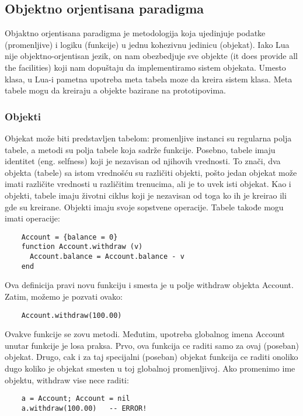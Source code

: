 \documentclass[a4paper]{article}
\begin{document}
\subsection{Objektno orjentisana paradigma}

Objaktno orjentisana paradigma je metodologija koja ujedinjuje podatke (promenljive) i logiku (funkcije) u jednu kohezivnu jedinicu (objekat). Iako Lua nije objektno-orjentisan jezik, on nam obezbedjuje sve objekte (it does provide all the facilities) koji nam dopuštaju da implementiramo sistem objekata. Umesto klasa, u Lua-i pametna upotreba meta tabela moze da kreira sistem klasa. Meta tabele mogu da kreiraju a objekte bazirane na prototipovima.

\subsubsection{Objekti}
Objekat može biti predstavljen tabelom: promenljive instanci su regularna polja tabele, a metodi su polja tabele koja sadrže funkcije. Posebno, tabele imaju identitet (eng. selfness) koji je nezavisan od njihovih vrednosti. To znači, dva objekta (tabele) sa istom vrednošću su različiti objekti, pošto jedan objekat može imati različite vrednosti u različitim trenucima, ali je to uvek isti objekat. Kao i objekti, tabele imaju životni ciklus koji je nezavisan od toga ko ih je kreirao ili gde su kreirane.
Objekti imaju svoje sopstvene operacije. Tabele takođe mogu imati operacije:
\begin{verbatim}
    Account = {balance = 0}
    function Account.withdraw (v)
      Account.balance = Account.balance - v
    end
\end{verbatim}
Ova definicija pravi novu funkciju i smesta je u polje withdraw objekta Account. Zatim, možemo je pozvati ovako:
\begin{verbatim}
    Account.withdraw(100.00)
\end{verbatim}

Ovakve funkcije se zovu metodi. Međutim, upotreba globalnog imena Account unutar funkcije je losa praksa. Prvo, ova funkcija ce raditi samo za ovaj (poseban) objekat. Drugo, cak i za taj specijalni (poseban) objekat funkcija ce raditi onoliko dugo koliko je objekat smesten u toj globalnoj promenljivoj. Ako promenimo ime objektu, withdraw vise nece raditi:
\begin{verbatim}
    a = Account; Account = nil
    a.withdraw(100.00)   -- ERROR!
\end{verbatim}
\end{document}
